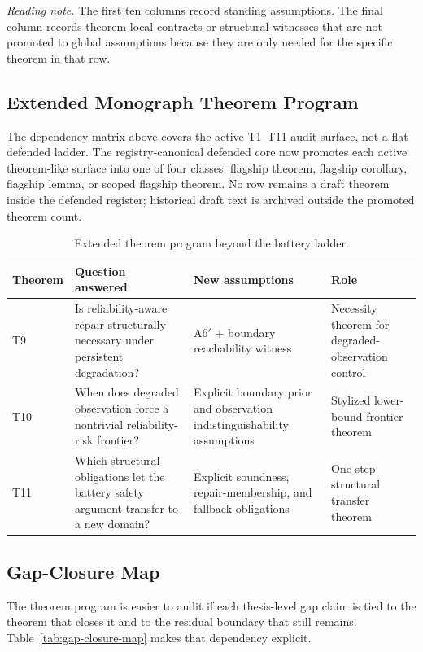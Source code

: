 \noindent\textit{Reading note.}  The first ten columns record standing
assumptions.  The final column records theorem-local contracts or structural
witnesses that are not promoted to global assumptions because they are only
needed for the specific theorem in that row.

\subsection{Extended Monograph Theorem Program}

The dependency matrix above covers the active T1--T11 audit surface, not a
flat defended ladder.  The registry-canonical defended core now promotes each
active theorem-like surface into one of four classes: flagship theorem,
flagship corollary, flagship lemma, or scoped flagship theorem.  No row remains
a draft theorem inside the defended register; historical draft text is
archived outside the promoted theorem count.

\begin{table}[htbp]
\centering
\caption{Extended theorem program beyond the battery ladder.}
\label{tab:extended-theorem-program}
\begin{tabular}{p{1.3cm}p{4.4cm}p{3.2cm}p{3.7cm}}
\toprule
\textbf{Theorem} & \textbf{Question answered} & \textbf{New assumptions} & \textbf{Role} \\
\midrule
T9 & Is reliability-aware repair structurally necessary under persistent degradation? & A6$'$ + boundary reachability witness & Necessity theorem for degraded-observation control \\
\addlinespace
T10 & When does degraded observation force a nontrivial reliability-risk frontier? & Explicit boundary prior and observation indistinguishability assumptions & Stylized lower-bound frontier theorem \\
\addlinespace
T11 & Which structural obligations let the battery safety argument transfer to a new domain? & Explicit soundness, repair-membership, and fallback obligations & One-step structural transfer theorem \\
\bottomrule
\end{tabular}
\end{table}

\subsection{Gap-Closure Map}

The theorem program is easier to audit if each thesis-level gap claim is tied
to the theorem that closes it and to the residual boundary that still
remains.  Table~\ref{tab:gap-closure-map} makes that dependency explicit.

